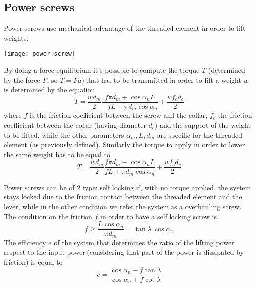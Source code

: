 \begin{multicols}{2}
\subsection{Power screws}
	Power screws use mechanical advantage of the threaded element in order to lift weights.
	\begin{center}
		\texttt{[image: power-screw]}
	\end{center}
	By doing a force equilibrium it's possible to compute the torque $T$ (determined by the force $F$, so $T=Fa$) that has to be transmitted in order to lift a weight $w$ is determined by the equation
	\begin{equation}
		T = \frac{w d_m}{2} \frac{f\pi d_m + \cos\alpha_n L}{-fL + \pi d_m \cos\alpha_n} + \frac{wf_cd_c}{2}
	\end{equation}
	where $f$ is the friction coefficient between the screw and the collar, $f_c$ the friction coefficient between the collar (having diameter $d_c$) and the support of the weight to be lifted, while the other parameters $\alpha_m,L,d_m$ are specific for the threaded element (as previously defined). Similarly the torque to apply in order to lower the same weight has to be equal to
	\[ T = \frac{w d_m}{2} \frac{f\pi d_m - \cos\alpha_n L}{fL + \pi d_m \cos\alpha_n} + \frac{wf_cd_c}{2} \]
	
	Power screws can be of 2 type: self locking if, with no torque applied, the system stays locked due to the friction contact between the threaded element and the lever, while in the other condition we refer the system as a overhauling screw. The condition on the friction $f$ in order to have a self locking screw is
	\[ f \geq \frac{L\cos\alpha_n}{\pi d_m} = \tan\lambda \, \cos\alpha_n \]
	The efficiency $e$ of the system that determines the ratio of the lifting power respect to the input power (considering that part of the power is dissipated by friction) is equal to
	\[ e= \frac{\cos\alpha_n - f\tan\lambda}{\cos\alpha_n + f\cot \lambda } \]
	
	
	
	
	
	
	
	
	
	
	
	
	
	
	
	
	
	
	
	
	
	
	
	
	
	
	
	
	
	
	
	
	
	
	
	
	
	
	
	
	
	
	
	
	
\end{multicols}